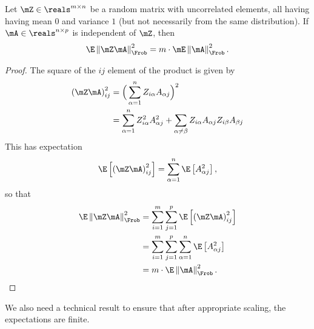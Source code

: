 \begin{lemma}\label{L:frob-random-product}
	Let $\mZ \in \reals^{m \times n}$ be a random matrix with uncorrelated
	elements, all having having mean $0$ and variance $1$ (but not necessarily 
	from the same distribution).  If $\mA \in \reals^{n \times p}$ is 
	independent of $\mZ$, then
	\[
		\E \left\|
			\mZ \mA
		\right\|_\Frob^2
			=
				m
				\cdot
				\mE \left\| \mA \right\|_\Frob^2.
	\]
\end{lemma}
\begin{proof}
	The square of the $ij$ element of the product is given by
	\begin{align*}
		\left( \mZ \mA \right)_{ij}^2
			&=
				\Big(
					\sum_{\alpha=1}^n
						Z_{i \alpha} A_{\alpha j}
				\Big)^2 \\
			&=
				\sum_{\alpha=1}^n
					Z_{i \alpha}^2 A_{\alpha j}^2
				+
				\sum_{\alpha \neq \beta}
					Z_{i \alpha} A_{\alpha j}
					Z_{i \beta}  A_{\beta j}
	\end{align*}
	This has expectation
	\[
		\E \left[
			\left( \mZ \mA \right)_{ij}^2
		\right]
			=
				\sum_{\alpha=1}^n
					\E\left[ A_{\alpha j}^2 \right],
	\]
	so that
	\begin{align*}
		\E \left\|
			\mZ \mA
		\right\|_\Frob^2
			&=
				\sum_{i=1}^m
				\sum_{j=1}^p
					\E \left[
						\left( \mZ \mA \right)_{ij}^2
					\right] \\
			&=
				\sum_{i=1}^m
				\sum_{j=1}^p
					\sum_{\alpha=1}^n
						\E\left[ A_{\alpha j}^2 \right] \\
			&= m \cdot \E \left\| \mA \right\|_\Frob^2. \qedhere
	\end{align*}
\end{proof}

We also need a technical result to ensure that after appropriate scaling, the
expectations are finite.

